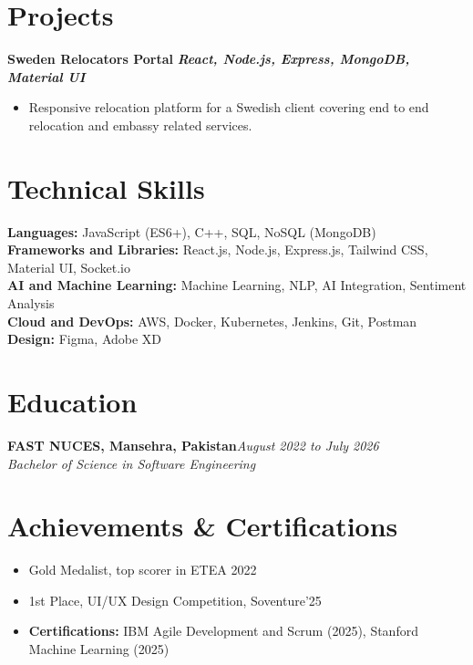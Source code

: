 \documentclass[11pt,letterpaper]{article}
\begin{document}
\section{Projects}
\textbf{Sweden Relocators Portal} \textbar{} \textbf{\textit{React, Node.js, Express, MongoDB, Material UI}}
\begin{itemize}
  \item Responsive relocation platform for a Swedish client covering end to end relocation and embassy related services.
\end{itemize}



\section{Technical Skills}
\textbf{Languages:} JavaScript (ES6+), C++, SQL, NoSQL (MongoDB)\\[0.1em]
\textbf{Frameworks and Libraries:} React.js, Node.js, Express.js, Tailwind CSS, Material UI, Socket.io\\[0.1em]
\textbf{AI and Machine Learning:} Machine Learning, NLP, AI Integration, Sentiment Analysis\\[0.1em]
\textbf{Cloud and DevOps:} AWS, Docker, Kubernetes, Jenkins, Git, Postman\\[0.1em]
\textbf{Design:} Figma, Adobe XD



\section{Education}
\textbf{FAST NUCES, Mansehra, Pakistan}\hfill\textit{August 2022 to July 2026}\\
\textit{Bachelor of Science in Software Engineering}



\section{Achievements \& Certifications}
\begin{itemize}
  \item Gold Medalist, top scorer in ETEA 2022
  \item 1st Place, UI/UX Design Competition, Soventure'25
  \item \textbf{Certifications:} IBM Agile Development and Scrum (2025), Stanford Machine Learning (2025)
\end{itemize}
\end{document}
